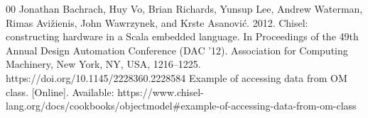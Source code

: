 \documentclass[sigconf]{acmart}
\begin{document}
\begin{thebibliography}{00}
 Jonathan Bachrach, Huy Vo, Brian Richards, Yunsup Lee, Andrew Waterman, Rimas Avižienis, John Wawrzynek, and Krste Asanović. 2012. Chisel: constructing hardware in a Scala embedded language. In Proceedings of the 49th Annual Design Automation Conference (DAC '12). Association for Computing Machinery, New York, NY, USA, 1216–1225. https://doi.org/10.1145/2228360.2228584
 Example of accessing data from OM class. [Online]. Available: https://www.chisel-lang.org/docs/cookbooks/objectmodel#example-of-accessing-data-from-om-class

\end{thebibliography}
\end{document}
